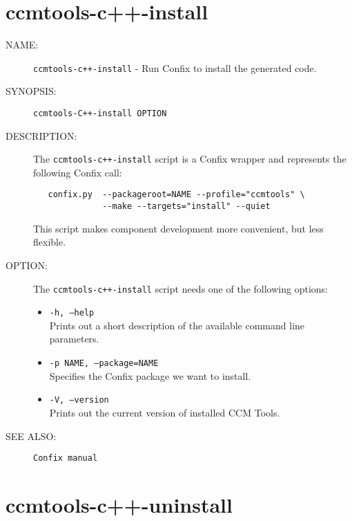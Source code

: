 \section{ccmtools-c++-install}
\begin{description}

\item [NAME:] 
  {\tt ccmtools-c++-install} - Run Confix to install the generated code.

\item [SYNOPSIS:] 
  {\tt ccmtools-C++-install OPTION}

\item [DESCRIPTION:]
  The {\tt ccmtools-c++-install} script is a Confix wrapper and
  represents the following Confix call:
  \begin{small}
  \begin{verbatim}
   confix.py  --packageroot=NAME --profile="ccmtools" \
              --make --targets="install" --quiet
  \end{verbatim}
  \end{small}
  This script makes component development more convenient,
  but less flexible. 

\item [OPTION:]
  The {\tt ccmtools-c++-install} script needs one of the following options:
  \begin{itemize}
  \item {\tt -h, --help} \\
    Prints out a short description of the available command line parameters.

  \item {\tt -p NAME, --package=NAME} \\
    Specifies the Confix package we want to install. 

  \item {\tt -V, --version} \\
    Prints out the current version of installed CCM Tools.
  \end{itemize}
  
\item [SEE ALSO:]
  {\tt Confix manual}
  
\end{description}



\section{ccmtools-c++-uninstall}

